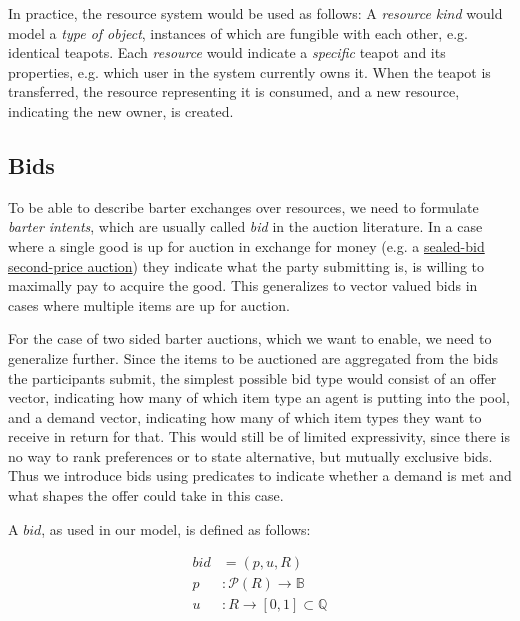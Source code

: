 In practice, the resource system would be used as follows: A \textit{resource kind} would model a \textit{type of object}, instances of which are fungible with each other, e.g. identical teapots. Each \textit{resource} would indicate a \textit{specific} teapot and its properties, e.g. which user in the system currently owns it. When the teapot is transferred, the resource representing it is consumed, and a new resource, indicating the new owner, is created.

\subsection{Bids}

To be able to describe barter exchanges over resources, we need to formulate \textit{barter intents}, which are usually called \textit{bid} in the auction literature. In a case where a single good is up for auction in exchange for money (e.g. a \href{https://en.wikipedia.org/wiki/Vickrey_auction}{sealed-bid second-price auction}) they indicate what the party submitting is, is willing to maximally pay to acquire the good. This generalizes to vector valued bids in cases where multiple items are up for auction.

For the case of two sided barter auctions, which we want to enable, we need to generalize further. Since the items to be auctioned are aggregated from the bids the participants submit, the simplest possible bid type would consist of an offer vector, indicating how many of which item type an agent is putting into the pool, and a demand vector, indicating how many of which item types they want to receive in return for that. This would still be of limited expressivity, since there is no way to rank preferences or to state alternative, but mutually exclusive bids. Thus we introduce bids using predicates to indicate whether a demand is met and what shapes the offer could take in this case.

A $bid$, as used in our model, is defined as follows:

\begin{equation}
    \begin{aligned}
        bid &= (p, u, R) \\
        p &: \mathcal{P}(R) \to \mathbb{B} \\
        u &: R \to [0, 1] \subset \mathbb{Q}\\
    \end{aligned}    
\end{equation}

